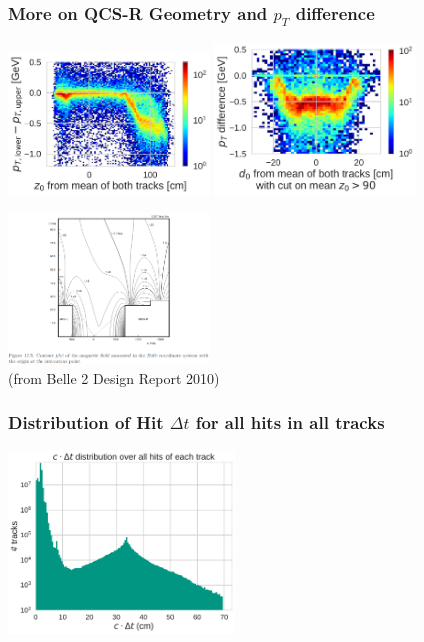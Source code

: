 \documentclass[18pt]{beamer}
\begin{document}
\begin{frame}
  \frametitle{More on QCS-R Geometry and $p_T$ difference}
  \includegraphics[width=0.4\textwidth]{figures/efficiency_study/pt_distance_by_z0_gcr_august2017_data.pdf}
  \includegraphics[width=0.4\textwidth]{figures/efficiency_study/pt_distance_by_d0_gcr_august2017_data.pdf}\\
  \begin{center}
    \includegraphics[width=0.4\textwidth]{figures/QCS-R.png}\\
    \scriptsize{(from Belle 2 Design Report 2010)}
  \end{center}
\end{frame}


\begin{frame}
  \frametitle{Distribution of Hit $\Delta t$ for all hits in all tracks}  
  \begin{center}
    \includegraphics[width=0.45\textwidth]{figures/delta_t/gcraugust_delta_t_log.pdf}
  \end{center}
\end{frame}
\end{document}

